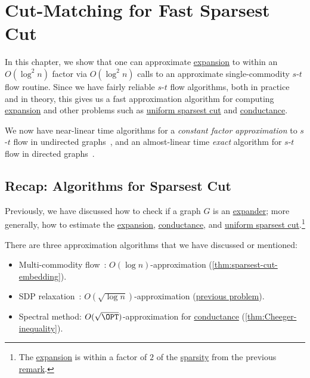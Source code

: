 \chapter{Cut-Matching for Fast Sparsest Cut}
In this chapter, we show that one can approximate \hyperref[def:expansion]{expansion} to within an \(O(\log ^2 n)\) factor via \(O(\log ^2 n)\) calls to an approximate single-commodity \(s\)-\(t\) flow routine. Since we have fairly reliable \(s\)-\(t\) flow algorithms, both in practice and in theory, this gives us a fast approximation algorithm for computing \hyperref[def:expansion]{expansion} and other problems such as \hyperref[prb:sparsest-cut]{uniform sparsest cut} and \hyperref[def:conductance]{conductance}.

\begin{note}
	We now have near-linear time algorithms for a \emph{constant factor approximation} to \(s\)-\(t\) flow in undirected graphs~\cite{peng2016approximate}, and an almost-linear time \emph{exact} algorithm for \(s\)-\(t\) flow in directed graphs~\cite{chen2022maximum}.
\end{note}

\section{Recap: Algorithms for Sparsest Cut}
Previously, we have discussed how to check if a graph \(G\) is an \hyperref[def:expander]{expander}; more generally, how to estimate the \hyperref[def:expansion]{expansion}, \hyperref[def:conductance]{conductance}, and \hyperref[prb:sparsest-cut]{uniform sparsest cut}.\footnote{The \hyperref[def:expansion]{expansion} is within a factor of \(2\) of the \hyperref[def:sparsity]{sparsity} from the previous \hyperref[rmk:expansion-sparsity]{remark}.}

\begin{prev}
	There are three approximation algorithms that we have discussed or mentioned:
	\begin{itemize}
		\item Multi-commodity flow~\cite{leighton1999multicommodity}: \(O(\log n)\)-approximation (\autoref{thm:sparsest-cut-embedding}).
		\item SDP relaxation~\cite{arora2009expander}: \(O(\sqrt{\log n} )\)-approximation (\hyperref[prb:SDP-sparsest-cut]{previous problem}).
		\item Spectral method: \(O(\sqrt{\OPT} )\)-approximation for \hyperref[def:conductance]{conductance} (\autoref{thm:Cheeger-inequality}).
	\end{itemize}
\end{prev}

